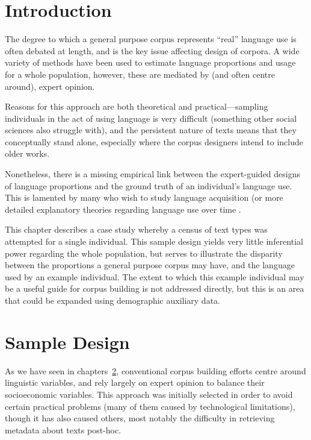 \section{Introduction}
The degree to which a general purpose corpus represents ``real'' language use is often debated at length, and is the key issue affecting design of corpora.  A wide variety of methods have been used to estimate language proportions and usage for a whole population, however, these are mediated by (and often centre around), expert opinion.

Reasons for this approach are both theoretical and practical---sampling individuals in the act of using language is very difficult (something other social sciences also struggle with), and the persistent nature of texts means that they conceptually stand alone, especially where the corpus designers intend to include older works.

Nonetheless, there is a missing empirical link between the expert-guided designs of language proportions and the ground truth of an individual's language use.  This is lamented by many who wish to study language acquisition (or more detailed explanatory theories regarding language use over time .

This chapter describes a case study whereby a census of text types was attempted for a single individual.  This sample design yields very little inferential power regarding the whole population, but serves to illustrate the disparity between the proportions a general purpose corpus may have, and the language used by an example individual.  The extent to which this example individual may be a useful guide for corpus building is not addressed directly, but this is an area that could be expanded using demographic auxiliary data.















\section{Sample Design}
As we have seen in chapters~\ref{}, conventional corpus building efforts centre around linguistic variables, and rely largely on expert opinion to balance their socioeconomic variables.  This approach was initially selected in order to avoid certain practical problems (many of them caused by technological limitations), though it has also caused others, most notably the difficulty in retrieving metadata about texts post-hoc.

